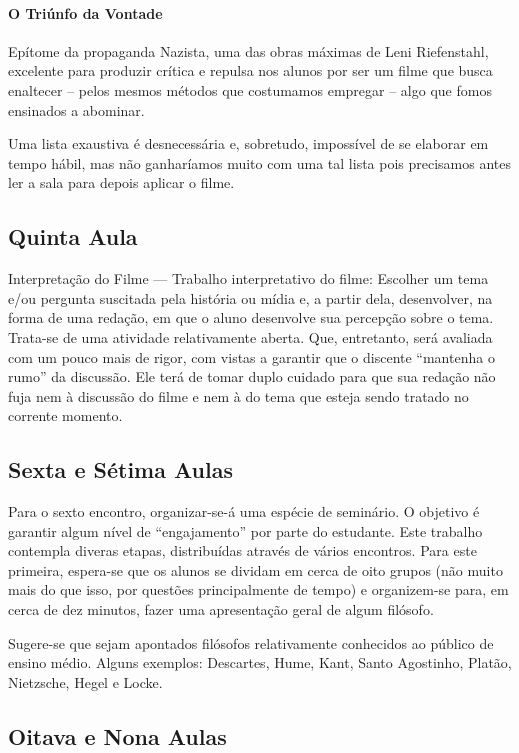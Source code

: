 \documentclass[12pt,a4paper]{article}
\begin{document}
	\paragraph{O Triúnfo da Vontade} Epítome da propaganda 
		Nazista, uma das obras máximas de Leni 
		Riefenstahl, excelente para produzir crítica e 
		repulsa nos alunos por ser um filme que busca 
		enaltecer -- pelos mesmos métodos que costumamos 
		empregar -- algo que fomos ensinados a abominar.
		
	Uma lista exaustiva é desnecessária e, sobretudo, 
	impossível de se elaborar em tempo hábil, mas não 
	ganharíamos muito com uma tal lista pois precisamos
	antes ler a sala para depois aplicar o filme.

	\subsection*{Quinta Aula}
	
	Interpretação do Filme --- Trabalho interpretativo do filme:
	Escolher um tema e/ou pergunta suscitada pela história ou 
	mídia e, a partir dela, desenvolver, na forma de uma redação, 
	em que o aluno desenvolve sua percepção sobre o tema. Trata-se 
	de uma atividade relativamente aberta. Que, entretanto, será 
	avaliada com um pouco mais de rigor, com vistas a garantir 
	que o discente ``mantenha o rumo'' da discussão. Ele terá de 
	tomar duplo cuidado para que sua redação não fuja nem à 
	discussão do filme e nem à do tema que esteja sendo tratado 
	no corrente momento. 

	\subsection*{Sexta e Sétima Aulas}
	
	Para o sexto encontro, organizar-se-á uma espécie de seminário. 
	O objetivo é garantir algum nível de ``engajamento'' por parte 
	do estudante. Este trabalho contempla diveras etapas, distribuídas 
	através de vários encontros. Para este primeira, espera-se que 
	os alunos se dividam em cerca de oito grupos (não muito mais do que 
	isso, por questões principalmente de tempo) e organizem-se para, 
	em cerca de dez minutos, fazer uma apresentação geral de algum
	filósofo. 
	
	Sugere-se que sejam apontados filósofos relativamente conhecidos 
	ao público de ensino médio. Alguns exemplos: Descartes, Hume, 
	Kant, Santo Agostinho, Platão, Nietzsche, Hegel e Locke. 
	
	\subsection*{Oitava e Nona Aulas}
	
\end{document}
